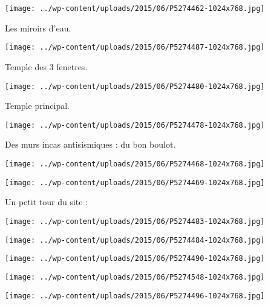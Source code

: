  \newline
 \newline
\centerline{\texttt{[image: ../wp-content/uploads/2015/06/P5274462-1024x768.jpg]} } 
 \newline
 Les miroirs d'eau. \newline
 \newline
\centerline{\texttt{[image: ../wp-content/uploads/2015/06/P5274487-1024x768.jpg]} } 
 \newline
 Temple des 3 fenetres. \newline
 \newline
\centerline{\texttt{[image: ../wp-content/uploads/2015/06/P5274480-1024x768.jpg]} } 
 \newline
 Temple principal. \newline
 \newline
\centerline{\texttt{[image: ../wp-content/uploads/2015/06/P5274478-1024x768.jpg]} } 
 \newline
 Des murs incas antisismiques : du bon boulot. \newline
 \newline
\centerline{\texttt{[image: ../wp-content/uploads/2015/06/P5274468-1024x768.jpg]} } 
 \newline
 \newline
\centerline{\texttt{[image: ../wp-content/uploads/2015/06/P5274469-1024x768.jpg]} } 
 \newline
 Un petit tour du site : \newline
 \newline
\centerline{\texttt{[image: ../wp-content/uploads/2015/06/P5274483-1024x768.jpg]} } 
 \newline
 \newline
\centerline{\texttt{[image: ../wp-content/uploads/2015/06/P5274484-1024x768.jpg]} } 
 \newline
 \newline
\centerline{\texttt{[image: ../wp-content/uploads/2015/06/P5274490-1024x768.jpg]} } 
 \newline
 \newline
\centerline{\texttt{[image: ../wp-content/uploads/2015/06/P5274548-1024x768.jpg]} } 
 \newline
 \newline
\centerline{\texttt{[image: ../wp-content/uploads/2015/06/P5274496-1024x768.jpg]} } 
 \newline
